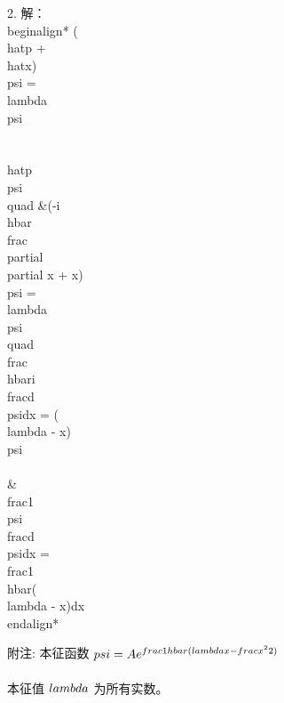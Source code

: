 2. 解：
\\begin{align*}
    (\\hat{p} + \\hat{x})\\psi = \\lambda \\psi \\\\
    \\hat{p}\\psi \\quad &(-i\\hbar\\frac{\\partial}{\\partial x} + x)\\psi = \\lambda \\psi \\quad \\frac{\\hbar}{i} \\frac{d\\psi}{dx} = (\\lambda - x)\\psi \\\\
    &\\frac{1}{\\psi} \\frac{d\\psi}{dx} = \\frac{1}{\\hbar}(\\lambda - x)dx
\\end{align*}

附注: 本征函数 $\\psi = Ae^{\\frac{1}{\\hbar}(\\lambda x - \\frac{x^2}{2})}$ \\\\
      本征值 $\\lambda$ 为所有实数。

